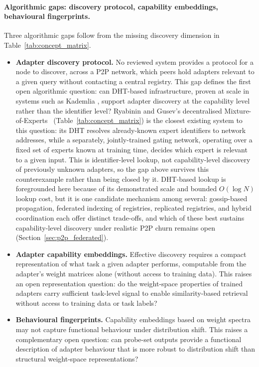 \paragraph{Algorithmic gaps: discovery protocol, capability embeddings, behavioural fingerprints.}
Three algorithmic gaps follow from the missing discovery dimension in Table~\ref{tab:concept_matrix}.
\begin{itemize}
  \item \textbf{Adapter discovery protocol.} No reviewed system provides a protocol for a node to discover, across a P2P network, which peers hold adapters relevant to a given query without contacting a central registry. This gap
    defines the first open algorithmic question: can DHT-based infrastructure,
    proven at scale in systems such as Kademlia \cite{MaymounkovKademlia2002},
    support adapter discovery at the capability level rather than the identifier level?
    Ryabinin and Gusev's decentralised Mixture-of-Experts~\cite{RyabininCrowdsourced2020}
    (Table~\ref{tab:concept_matrix}) is the closest existing system to this question:
    its DHT resolves already-known expert identifiers to network addresses, while a
    separately, jointly-trained gating network, operating over a fixed set of experts
    known at training time, decides which expert is relevant to a given input. This is
    identifier-level lookup, not capability-level discovery of previously unknown
    adapters, so the gap above survives this counterexample rather than being closed
    by it.
    DHT-based lookup is foregrounded here because of its demonstrated scale and
    bounded $O(\log N)$ lookup cost, but it is one candidate mechanism among
    several: gossip-based propagation, federated indexing of registries,
    replicated registries, and hybrid coordination each offer distinct trade-offs,
    and which of these best sustains capability-level discovery under realistic
    P2P churn remains open (Section~\ref{sec:p2p_federated}).
  \item \textbf{Adapter capability embeddings.} Effective discovery requires
    a compact representation of what task a given adapter performs, computable from
    the adapter's weight matrices alone (without access to training data).
    This raises an open representation question: do the weight-space properties
    of trained adapters carry sufficient task-level signal to enable
    similarity-based retrieval without access to training data or task labels?
  \item \textbf{Behavioural fingerprints.} Capability embeddings based on
    weight spectra may not capture functional behaviour under distribution shift.
    This raises a complementary open question: can probe-set
    outputs provide a functional description of adapter behaviour that is
    more robust to distribution shift than structural weight-space representations?
\end{itemize}


